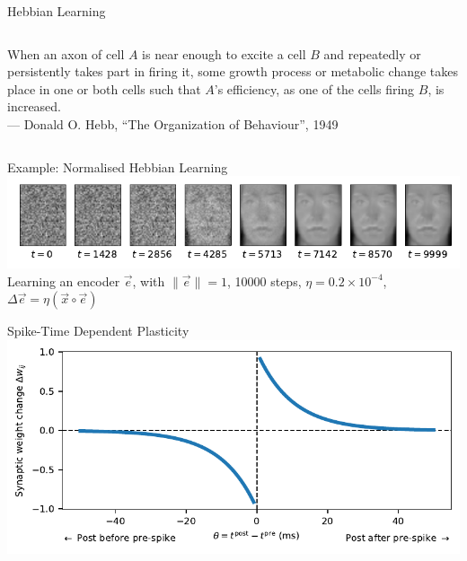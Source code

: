 \documentclass[handout,aspectratio=169]{beamer}
\begin{document}
	\begin{frame}{Hebbian Learning}
		\begin{columns}
			{\large\justify\quotefont When an axon of cell $A$ is near enough to excite a cell $B$ and repeatedly or persistently takes part in firing it, some growth process or metabolic change takes place in one or both cells such that $A$'s efficiency, as one of the cells firing $B$, is increased.\\[0.25cm]\raggedleft\color{aluminium4} --- Donald O. Hebb, \enquote{The Organization of Behaviour}, 1949\\}
		\end{columns}
	\end{frame}

	\begin{frame}{Example: Normalised Hebbian Learning}
		\centering
		\includegraphics[width=\textwidth]{media/hebbian_learning_example.pdf}
		Learning an encoder $\vec e$, with $\| \vec e \| = 1$, 10000 steps, $\eta = 0.2 \times 10^{-4}$, $\Delta \vec e = \eta (\vec x \circ \vec e)$
	\end{frame}

	\begin{frame}{Spike-Time Dependent Plasticity}
        \centering
		\includegraphics{media/stdp.pdf}
	\end{frame}
\end{document}
